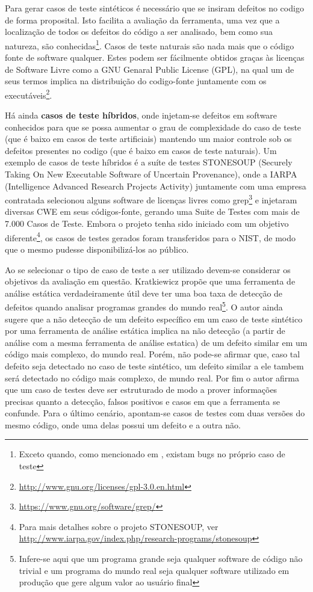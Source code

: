   Para gerar casos de teste sintéticos é necessário que se insiram defeitos no codigo de forma proposital. Isto facilita a avaliação da ferramenta, uma vez que a localização de todos os defeitos do código a ser analisado, bem como sua natureza, são conhecidas\footnote{Exceto quando, como mencionado em \cite{pascal}, existam bugs no próprio caso de teste}. Casos de teste naturais são nada mais que o código fonte de software qualquer. Estes podem ser fácilmente obtidos graças às licenças de Software Livre como a GNU Genaral Public License (GPL),  na qual um de seus termos implica na distribuição do codigo-fonte juntamente com os executáveis\footnote{\url{http://www.gnu.org/licenses/gpl-3.0.en.html}}.

  Há ainda \textbf{casos de teste híbridos}, onde injetam-se defeitos em software conhecidos para que se possa aumentar o grau de complexidade do caso de teste (que é baixo em casos de teste artificiais) mantendo um maior controle sob os defeitos presentes no codigo (que é baixo em casos de teste naturais). Um exemplo de casos de teste híbridos é a suíte de testes STONESOUP (Securely Taking On New Executable Software of Uncertain Provenance), onde a IARPA (Intelligence Advanced Research Projects Activity) juntamente com uma empresa contratada selecionou alguns software de licenças livres como grep\footnote{\url{https://www.gnu.org/software/grep/}} e injetaram diversas CWE em seus códigos-fonte, gerando uma Suite de Testes com mais de 7.000 Casos de Teste. Embora o projeto tenha sido iniciado com um objetivo diferente\footnote{Para mais detalhes sobre o projeto STONESOUP, ver \url{http://www.iarpa.gov/index.php/research-programs/stonesoup}}, os casos de testes gerados foram transferidos para o NIST, de modo que o mesmo pudesse disponibilizá-los ao público.

  Ao se selecionar o tipo de caso de teste a ser utilizado devem-se considerar os objetivos da avaliação em questão. Kratkiewicz \cite{harvard} propõe que uma ferramenta de análise estática verdadeiramente útil deve ter uma boa taxa de detecção de defeitos quando  analisar programas grandes do mundo real\footnote{Infere-se aqui que um programa grande seja qualquer software de código não trivial e um programa do mundo real seja qualquer software utilizado em produção que gere algum valor ao usuário final}. O autor ainda sugere que a não detecção de um defeito específico em um caso de teste sintético por uma ferramenta de análise estática implica na não detecção (a partir de análise com a mesma ferramenta de análise estatica) de um defeito similar em um código mais complexo, do mundo real. Porém, não pode-se afirmar que, caso tal defeito seja detectado no caso de teste sintético, um defeito similar a ele tambem será detectado no código mais complexo, de mundo real. Por fim o autor afirma que um caso de testes deve ser estruturado de modo a prover informações precisas quanto a detecção, falsos positivos e casos em que a ferramenta se confunde. Para o último cenário, apontam-se casos de testes com duas versões do mesmo código, onde uma delas possui um defeito e a outra não.

